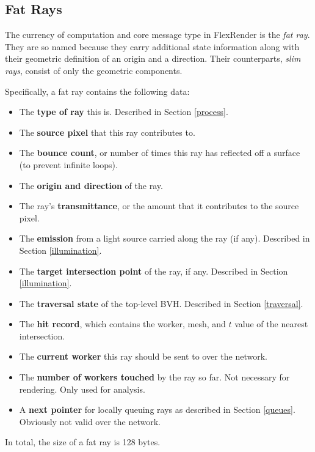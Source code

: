 \documentclass[12pt]{ucthesis}
\begin{document}
\subsection{Fat Rays}
\label{fatrays}

The currency of computation and core message type in FlexRender is the
\emph{fat ray}. They are so named because they carry additional state
information along with their geometric definition of an origin and a direction.
Their counterparts, \emph{slim rays}, consist of only the geometric components.

Specifically, a fat ray contains the following data:

\begin{itemize}
    \item The \textbf{type of ray} this is. Described in Section \ref{process}.
    \item The \textbf{source pixel} that this ray contributes to.
    \item The \textbf{bounce count}, or number of times this ray has reflected
        off a surface (to prevent infinite loops).
    \item The \textbf{origin and direction} of the ray.
    \item The ray's \textbf{transmittance}, or the amount that it contributes
        to the source pixel.
    \item The \textbf{emission} from a light source carried along the ray (if
        any). Described in Section \ref{illumination}.
    \item The \textbf{target intersection point} of the ray, if any. Described
        in Section \ref{illumination}.
    \item The \textbf{traversal state} of the top-level BVH. Described in
        Section \ref{traversal}.
    \item The \textbf{hit record}, which contains the worker, mesh, and $t$
        value of the nearest intersection.
    \item The \textbf{current worker} this ray should be sent to over the
        network.
    \item The \textbf{number of workers touched} by the ray so far. Not
        necessary for rendering. Only used for analysis.
    \item A \textbf{next pointer} for locally queuing rays as described in
        Section \ref{queues}. Obviously not valid over the network.
\end{itemize}

In total, the size of a fat ray is 128 bytes.
\end{document}
